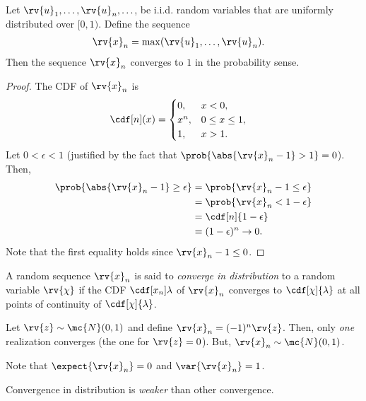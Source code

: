 \begin{example}
    Let $\rv{u}_{1},\ldots, \rv{u}_{n}, \ldots$, be i.i.d. random variables that are uniformly distributed over $[0, 1)$. Define the sequence
    \begin{align}
        \rv{x}_{n} &= \max (\rv{u}_{1},\ldots, \rv{u}_{n}).
    \end{align}
    Then the sequence $\rv{x}_{n}$ converges to $1$ in the probability sense.
    \begin{proof}
        The CDF of $\rv{x}_{n}$ is
        \begin{align}
            \cdf[n](x) &= 
            \begin{cases}
                0, & x<0,\\
                x^{n}, & 0\leq x\leq 1,\\
                1, & x>1.
            \end{cases}
        \end{align}
        Let $0<\epsilon<1$ (justified by the fact that $\prob{\abs{\rv{x}_{n} - 1}>1}=0$). Then,
        \begin{align}
            \prob{\abs{\rv{x}_{n} - 1} \geq \epsilon} &= 
            \prob{\rv{x}_{n} - 1 \leq \epsilon}\\
            &= \prob{\rv{x}_{n} < 1 - \epsilon}\\
            &= \cdf[n]{1-\epsilon}\\
            &= (1-\epsilon)^{n} \to 0.
        \end{align}
        Note that the first equality holds since $\rv{x}_{n} - 1 \leq 0$.
    \end{proof}
\end{example}

\begin{definitionBox}
  A random sequence $\rv{x}_{n}$ is said to \emph{converge in distribution} to a random variable $\rv{\chi}$ if the CDF $\cdf[x_{n}]{\lambda}$ of $\rv{x}_{n}$ converges to $\cdf[\chi]{\lambda}$ at all points of continuity of $\cdf[\chi]{\lambda}$.
\end{definitionBox}

\begin{example}
        Let $\rv{z}\sim \mc{N}(0, 1)$ and define $\rv{x}_{n} = (-1)^{n}\rv{z}$. Then, only \emph{one} realization converges (the one for $\rv{z}=0$). But, $\rv{x}_{n}\sim\mc{N}(0,1)$.

        Note that $\expect{\rv{x}_{n}} = 0$ and $\var{\rv{x}_{n}} = 1$.
\end{example}
\begin{remarkBox}
    Convergence in distribution is \emph{weaker} than other convergence.
\end{remarkBox}

